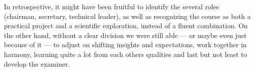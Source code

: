 In retrospective, it might have been fruitful to identify the several roles
(chairman, secretary, technical leader), as well as recognizing the course as
both a practical project and a scientific exploration, instead of a fluent
combination. On the other hand, without a clear division we were still able --- or maybe
even just because of it --- to adjust on shifting insights and expectations, 
work together in harmony, learning quite a lot from each others qualities and
last but not least to develop the \gls{examiner}.
